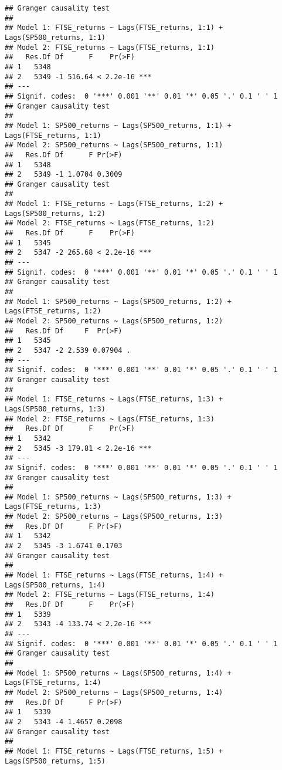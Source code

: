 \documentclass[]{article}
\begin{document}
\begin{verbatim}
## Granger causality test
## 
## Model 1: FTSE_returns ~ Lags(FTSE_returns, 1:1) + Lags(SP500_returns, 1:1)
## Model 2: FTSE_returns ~ Lags(FTSE_returns, 1:1)
##   Res.Df Df      F    Pr(>F)    
## 1   5348                        
## 2   5349 -1 516.64 < 2.2e-16 ***
## ---
## Signif. codes:  0 '***' 0.001 '**' 0.01 '*' 0.05 '.' 0.1 ' ' 1
## Granger causality test
## 
## Model 1: SP500_returns ~ Lags(SP500_returns, 1:1) + Lags(FTSE_returns, 1:1)
## Model 2: SP500_returns ~ Lags(SP500_returns, 1:1)
##   Res.Df Df      F Pr(>F)
## 1   5348                 
## 2   5349 -1 1.0704 0.3009
## Granger causality test
## 
## Model 1: FTSE_returns ~ Lags(FTSE_returns, 1:2) + Lags(SP500_returns, 1:2)
## Model 2: FTSE_returns ~ Lags(FTSE_returns, 1:2)
##   Res.Df Df      F    Pr(>F)    
## 1   5345                        
## 2   5347 -2 265.68 < 2.2e-16 ***
## ---
## Signif. codes:  0 '***' 0.001 '**' 0.01 '*' 0.05 '.' 0.1 ' ' 1
## Granger causality test
## 
## Model 1: SP500_returns ~ Lags(SP500_returns, 1:2) + Lags(FTSE_returns, 1:2)
## Model 2: SP500_returns ~ Lags(SP500_returns, 1:2)
##   Res.Df Df     F  Pr(>F)  
## 1   5345                   
## 2   5347 -2 2.539 0.07904 .
## ---
## Signif. codes:  0 '***' 0.001 '**' 0.01 '*' 0.05 '.' 0.1 ' ' 1
## Granger causality test
## 
## Model 1: FTSE_returns ~ Lags(FTSE_returns, 1:3) + Lags(SP500_returns, 1:3)
## Model 2: FTSE_returns ~ Lags(FTSE_returns, 1:3)
##   Res.Df Df      F    Pr(>F)    
## 1   5342                        
## 2   5345 -3 179.81 < 2.2e-16 ***
## ---
## Signif. codes:  0 '***' 0.001 '**' 0.01 '*' 0.05 '.' 0.1 ' ' 1
## Granger causality test
## 
## Model 1: SP500_returns ~ Lags(SP500_returns, 1:3) + Lags(FTSE_returns, 1:3)
## Model 2: SP500_returns ~ Lags(SP500_returns, 1:3)
##   Res.Df Df      F Pr(>F)
## 1   5342                 
## 2   5345 -3 1.6741 0.1703
## Granger causality test
## 
## Model 1: FTSE_returns ~ Lags(FTSE_returns, 1:4) + Lags(SP500_returns, 1:4)
## Model 2: FTSE_returns ~ Lags(FTSE_returns, 1:4)
##   Res.Df Df      F    Pr(>F)    
## 1   5339                        
## 2   5343 -4 133.74 < 2.2e-16 ***
## ---
## Signif. codes:  0 '***' 0.001 '**' 0.01 '*' 0.05 '.' 0.1 ' ' 1
## Granger causality test
## 
## Model 1: SP500_returns ~ Lags(SP500_returns, 1:4) + Lags(FTSE_returns, 1:4)
## Model 2: SP500_returns ~ Lags(SP500_returns, 1:4)
##   Res.Df Df      F Pr(>F)
## 1   5339                 
## 2   5343 -4 1.4657 0.2098
## Granger causality test
## 
## Model 1: FTSE_returns ~ Lags(FTSE_returns, 1:5) + Lags(SP500_returns, 1:5)

\end{verbatim}
\end{document}
